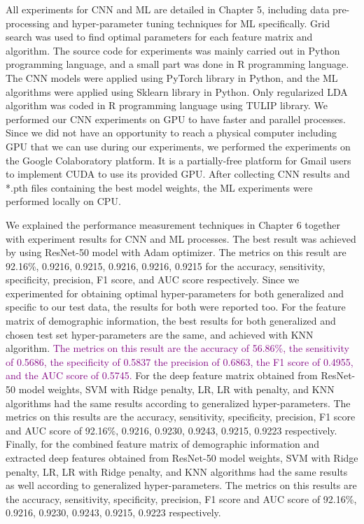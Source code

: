 All experiments for CNN and ML are detailed in Chapter 5, including data pre-processing and hyper-parameter tuning techniques for ML specifically. Grid search was used to find optimal parameters for each feature matrix and algorithm. The source code for experiments was mainly carried out in Python programming language, and a small part was done in R programming language. The CNN models were applied using PyTorch library in Python, and the ML algorithms were applied using Sklearn library in Python. Only regularized LDA algorithm was coded in R programming language using TULIP library. We performed our CNN experiments on GPU to have faster and parallel processes. Since we did not have an opportunity to reach a physical computer including GPU that we can use during our experiments, we performed the experiments on the Google Colaboratory platform. It is a partially-free platform for Gmail users to implement CUDA to use its provided GPU. After collecting CNN results and *.pth files containing the best model weights, the ML experiments were performed locally on CPU.

We explained the performance measurement techniques in Chapter 6 together with experiment results for CNN and ML processes. The best result was achieved by using ResNet-50 model with Adam optimizer. The metrics on this result are 92.16\%, 0.9216, 0.9215, 0.9216, 0.9216, 0.9215 for the accuracy, sensitivity, specificity, precision, F1 score, and AUC score respectively. Since we experimented for obtaining optimal hyper-parameters for both generalized and specific to our test data, the results for both were reported too. For the feature matrix of demographic information, the best results for both generalized and chosen test set hyper-parameters are the same, and achieved with KNN algorithm. \textcolor{purple}{The metrics on this result are the accuracy of 56.86\%, the sensitivity of 0.5686, the specificity of 0.5837 the precision of 0.6863, the F1 score of 0.4955, and the AUC score of 0.5745.} For the deep feature matrix obtained from ResNet-50 model weights, SVM with Ridge penalty, LR, LR with penalty, and KNN algorithms had the same results according to generalized hyper-parameters. The metrics on this results are the accuracy, sensitivity, specificity, precision, F1 score and AUC score of 92.16\%, 0.9216, 0.9230, 0.9243, 0.9215, 0.9223 respectively. Finally, for the combined feature matrix of demographic information and extracted deep features obtained from ResNet-50 model weights, SVM with Ridge penalty, LR, LR with Ridge penalty, and KNN algorithms had the same results as well according to generalized hyper-parameters. The metrics on this results are the accuracy, sensitivity, specificity, precision, F1 score and AUC score of 92.16\%, 0.9216, 0.9230, 0.9243, 0.9215, 0.9223 respectively.

